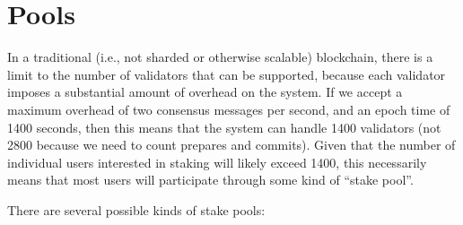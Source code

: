 \documentclass[12pt, final]{article}
\begin{document}




\section{Pools}

In a traditional (i.e., not sharded or otherwise scalable) blockchain, there is a limit to the number of validators that can be supported, because each validator imposes a substantial amount of overhead on the system. If we accept a maximum overhead of two consensus messages per second, and an epoch time of 1400 seconds, then this means that the system can handle 1400 validators (not 2800 because we need to count prepares and commits). Given that the number of individual users interested in staking will likely exceed 1400, this necessarily means that most users will participate through some kind of ``stake pool''.

There are several possible kinds of stake pools:
\end{document}
